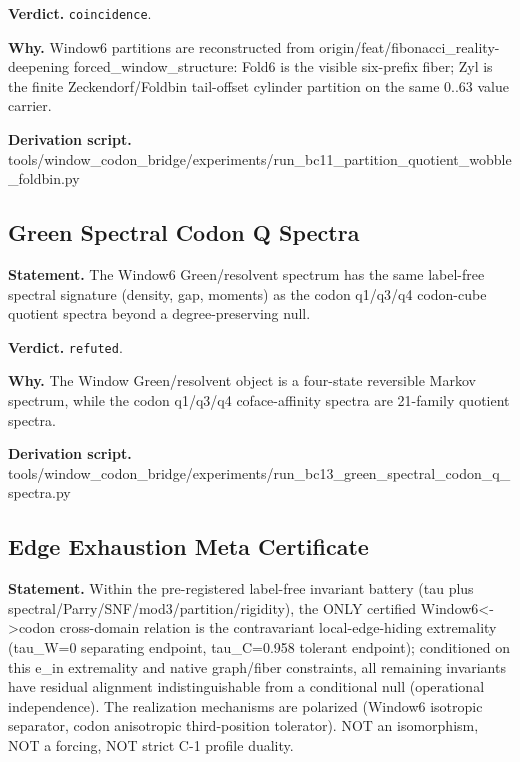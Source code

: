 \textbf{Verdict.} \texttt{coincidence}.

\textbf{Why.} Window6 partitions are reconstructed from origin/feat/fibonacci\_reality-deepening
forced\_window\_structure: Fold6 is the visible six-prefix fiber; Zyl is the finite
Zeckendorf/Foldbin tail-offset cylinder partition on the same 0..63 value carrier.

\textbf{Derivation script.} tools/window\_codon\_bridge/experiments/run\_bc11\_partition\_quotient\_wobble\_foldbin.py

\subsection{Green Spectral Codon Q Spectra}\label{sec:bridge-green-spectral-codon-q-spectra}
\textbf{Statement.} The Window6 Green/resolvent spectrum has the same label-free spectral signature (density, gap,
moments) as the codon q1/q3/q4 codon-cube quotient spectra beyond a degree-preserving null.

\textbf{Verdict.} \texttt{refuted}.

\textbf{Why.} The Window Green/resolvent object is a four-state reversible Markov spectrum, while the codon
q1/q3/q4 coface-affinity spectra are 21-family quotient spectra.

\textbf{Derivation script.} tools/window\_codon\_bridge/experiments/run\_bc13\_green\_spectral\_codon\_q\_spectra.py

\subsection{Edge Exhaustion Meta Certificate}\label{sec:bridge-edge-exhaustion-meta-certificate}
\textbf{Statement.} Within the pre-registered label-free invariant battery (tau plus
spectral/Parry/SNF/mod3/partition/rigidity), the ONLY certified Window6<->codon cross-domain
relation is the contravariant local-edge-hiding extremality (tau\_W=0 separating endpoint,
tau\_C=0.958 tolerant endpoint); conditioned on this e\_in extremality and native graph/fiber
constraints, all remaining invariants have residual alignment indistinguishable from a conditional
null (operational independence). The realization mechanisms are polarized (Window6 isotropic
separator, codon anisotropic third-position tolerator). NOT an isomorphism, NOT a forcing, NOT
strict C-1 profile duality.

